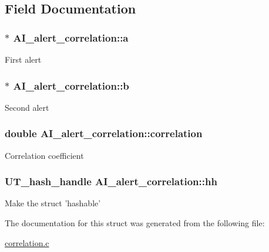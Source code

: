 \subsection{Field Documentation}
\hypertarget{structAI__alert__correlation_a8737f171e1c1b2305c8fe77101d6aeb7}{
\subsubsection[{a}]{$\ast$ {\bf AI\_\-alert\_\-correlation::a}}}
\label{structAI__alert__correlation_a8737f171e1c1b2305c8fe77101d6aeb7}
First alert \hypertarget{structAI__alert__correlation_a478f1a6f18f9c083b203efdf776379cd}{
\subsubsection[{b}]{$\ast$ {\bf AI\_\-alert\_\-correlation::b}}}
\label{structAI__alert__correlation_a478f1a6f18f9c083b203efdf776379cd}
Second alert \hypertarget{structAI__alert__correlation_aad417b2126ae26d7576f006a3dbcdc81}{
\subsubsection[{correlation}]{\setlength{\rightskip}{0pt plus 5cm}double {\bf AI\_\-alert\_\-correlation::correlation}}}
\label{structAI__alert__correlation_aad417b2126ae26d7576f006a3dbcdc81}
Correlation coefficient \hypertarget{structAI__alert__correlation_ad3020a87936a2193a92f09331401ad42}{
\subsubsection[{hh}]{\setlength{\rightskip}{0pt plus 5cm}UT\_\-hash\_\-handle {\bf AI\_\-alert\_\-correlation::hh}}}
\label{structAI__alert__correlation_ad3020a87936a2193a92f09331401ad42}
Make the struct 'hashable' 

The documentation for this struct was generated from the following file:\begin{DoxyCompactItemize}
\item 
\hyperlink{correlation_8c}{correlation.c}\end{DoxyCompactItemize}
